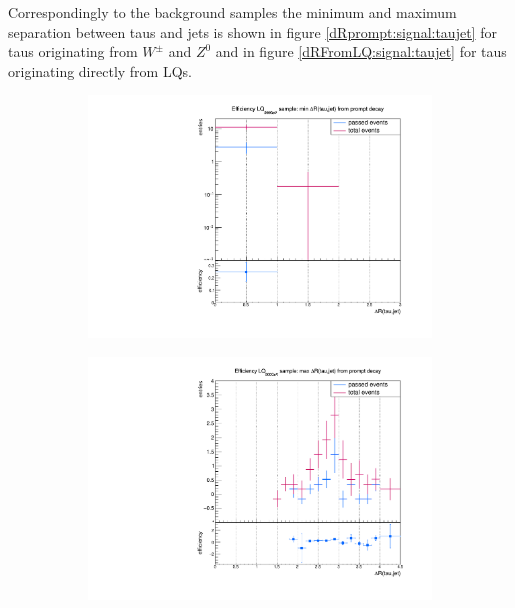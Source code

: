 %
Correspondingly to the background samples the minimum and maximum separation between taus and jets is shown in figure \ref{dRprompt:signal:taujet} for taus originating from $W^\pm$ and $Z^0$ and in figure \ref{dRFromLQ:signal:taujet} for taus originating directly from LQs.\newline
%
\begin{figure}
  \centering
                \begin{subfigure}[t]{0.49\textwidth}
                \includegraphics[width=\textwidth]{figures/plots/LQ75/Divided_pr_mindR_taujet.pdf}
                \label{dRprompt:signal:taujet:minLQ75}
                \end{subfigure}
                \begin{subfigure}[t]{0.49\textwidth}
                \includegraphics[width=\textwidth]{figures/plots/LQ75/Divided_maxdR_pr_taujet.pdf}

\end{subfigure}
\end{figure}
